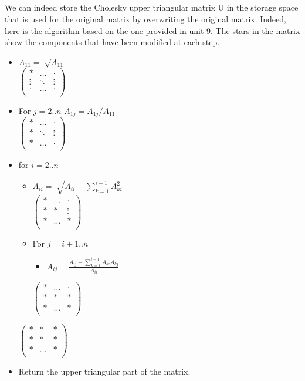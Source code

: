 \documentclass{llncs}\usepackage[]{graphicx}\usepackage[]{color}
\begin{document}
\subsection{}
We can indeed store the Cholesky upper triangular matrix U in the storage space that is used for the original matrix by overwriting the original matrix. Indeed, here is the algorithm based on the one provided in unit 9. The stars in the matrix show the components that have been modified at each step.
\begin{itemize}
\item $A_{11}=\sqrt[]{A_{11}}$\\
$\begin{pmatrix}
   \ast      & \ldots      & \cdot        \\
   \vdots   & \ddots 	  & \vdots             \\
   \cdot    & \ldots      & \cdot   \\
 \end{pmatrix}$
\item For $j=2..n$ $A_{1j}=A_{1j}/A_{11}$\\
$\begin{pmatrix}
   \ast      & \ldots      & \cdot        \\
   \ast   & \ddots 	  & \vdots             \\
   \ast    & \ldots      & \cdot   \\
 \end{pmatrix}$
\item for $i = 2..n$
\begin{itemize}
\item $A_{ii}=\sqrt[]{A_{ii}-\sum_{k=1}^{i-1}A^{2}_{ki}}$\\
$\begin{pmatrix}
   \ast      & \ldots      & \cdot        \\
   \ast   & \ast 	  & \vdots             \\
   \ast    & \ldots      & \ast   \\
 \end{pmatrix}$
\item For $j = i+1..n$
\begin{itemize}
\item $A_{ij}=\frac{A_{ij}-\sum_{k=1}^{i-1}A_{ki}A_{kj}}{A_{ii}}$ 
\end{itemize}
$\begin{pmatrix}
   \ast      & \ldots      & \cdot        \\
   \ast   & \ast 	  & \ast             \\
   \ast    & \ldots      & \ast   \\
 \end{pmatrix}$
\end{itemize}
$\begin{pmatrix}
   \ast      & \ast      & \ast        \\
   \ast   & \ast 	  & \ast             \\
   \ast    & \ldots      & \ast   \\
 \end{pmatrix}$
\item Return the upper triangular part of the matrix.
\end{itemize}
\end{document}

